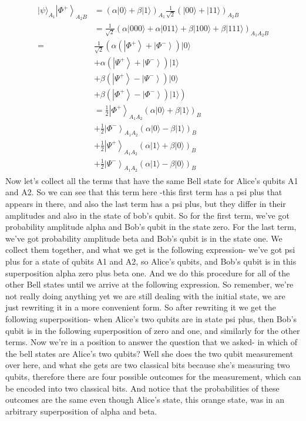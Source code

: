 \begin{align}
    \begin{aligned}
|\psi\rangle_{A_{1}}\left|\Phi^{+}\right\rangle_{A_{2} B} &=(\alpha|0\rangle+\beta|1\rangle)_{A_{1}} \frac{1}{\sqrt{2}}(|00\rangle+|11\rangle)_{A_{2} B} \\
&=\frac{1}{\sqrt{2}}(\alpha|000\rangle+\alpha|011\rangle+\beta|100\rangle+\beta|111\rangle)_{A_{1} A_{2} B} \\
=& \frac{1}{\sqrt{2}}\left(\alpha\left(\left|\Phi^{+}\right\rangle+\left|\Phi^{-}\right\rangle\right)|0\rangle\right.\\
&+\alpha\left(\left|\Psi^{+}\right\rangle+\left|\Psi^{-}\right\rangle\right)|1\rangle \\
&+\beta\left(\left|\Psi^{+}\right\rangle-\left|\Psi^{-}\right\rangle\right)|0\rangle \\
&\left.+\beta\left(\left|\Phi^{+}\right\rangle-\left|\Phi^{-}\right\rangle\right)|1\rangle\right) \\
&=\frac{1}{2}\left|\Phi^{+}\right\rangle_{A_{1} A_{2}}(\alpha|0\rangle+\beta|1\rangle)_{B} \\
&+\frac{1}{2}\left|\Phi^{-}\right\rangle_{A_{1} A_{2}}(\alpha|0\rangle-\beta|1\rangle)_{B} \\
&+\frac{1}{2}\left|\Psi^{+}\right\rangle_{A_{1} A_{2}}(\alpha|1\rangle+\beta|0\rangle)_{B} \\
&+\frac{1}{2}\left|\Psi^{-}\right\rangle_{A_{1} A_{2}}(\alpha|1\rangle-\beta|0\rangle)_{B}
\end{aligned}
\end{align}
Now let's collect all the terms that have the same Bell state for Alice's qubits A1 and A2. So we can see that this term here -this first term has a psi plus that appears in there, and also the last term has a psi plus, but they differ in their amplitudes and also in the state of bob's qubit. So for the first term, we've got probability amplitude alpha and Bob's qubit in the state zero. For the last term, we've got probability amplitude beta and Bob's qubit is in the state one. We collect them together, and what we get is the following expression- we've got psi plus for a state of qubits A1 and A2, so Alice's qubits, and Bob's qubit is in this superposition alpha zero plus beta one. And we do this procedure for all of the other Bell states until we arrive at the following expression. So remember, we're not really doing anything yet we are still dealing with the initial state, we are just rewriting it in a more convenient form. So after rewriting it we get the following superposition- when Alice's two qubits are in state psi plus, then Bob's qubit is in the following superposition of zero and one, and similarly for the other terms. Now we're in a position to answer the question that we asked- in which of the bell states are Alice's two qubits? Well she does the two qubit measurement over here, and what she gets are two classical bits because she's measuring two qubits, therefore there are four possible outcomes for the measurement, which can be encoded into two classical bits. And notice that the probabilities of these outcomes are the same even though Alice's state, this orange state, was in an arbitrary superposition of alpha and beta.

